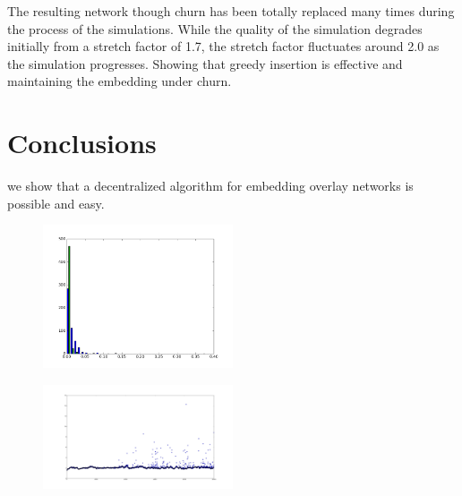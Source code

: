 The resulting network though churn has been totally replaced many times during the process of the simulations. 
While the quality of the simulation degrades initially from a stretch factor of 1.7, the stretch factor fluctuates around 2.0 as the simulation progresses.
Showing that greedy insertion is effective and maintaining the embedding under churn.


\section{Conclusions}
we show that a decentralized algorithm for embedding overlay networks is possible and easy.

\begin{figure}[h]
 \includegraphics[width=0.5\textwidth]{congestion_3}
\end{figure}

\begin{figure}[h]
 \includegraphics[width=0.5\textwidth]{churn_stretch}
\end{figure}
